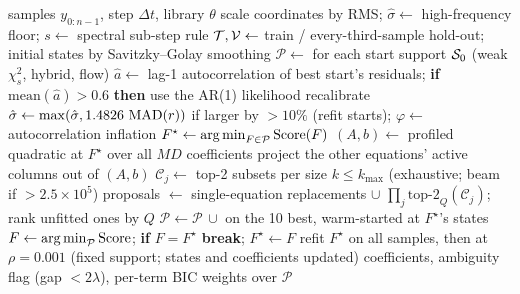 \begin{algorithm}[t]
\caption{PJSS (white-noise path). Defaults: $\rho=0.03$, $c=2$, $k_{\max}=5$, two candidates per size, ten finalists, two rounds.}
\label{alg:pjss}
\begin{algorithmic}[1]
\Require samples $y_{0:n-1}$, step $\Delta t$, library $\theta$
\State scale coordinates by RMS; $\hat\sigma\gets$ high-frequency floor; $s\gets$ spectral sub-step rule
\State $\mathcal{T},\mathcal{V}\gets$ train / every-third-sample hold-out; initial states by Savitzky--Golay smoothing
\State $\mathcal P\gets$  for each start support $\mathcal{S}_0$ (weak $\chi^2_s$, hybrid, flow)
\State $\hat a\gets$ lag-1 autocorrelation of best start's residuals; \textbf{if} $\mathrm{mean}(\hat a)>0.6$ \textbf{then} use the AR(1) likelihood
\State recalibrate $\hat\sigma\gets\max(\hat\sigma,1.4826\,\operatorname{MAD}(r))$ if larger by $>10\%$ (refit starts); $\varphi\gets$ autocorrelation inflation
\State $F^\star\gets\operatorname*{arg\,min}_{F\in\mathcal P}\mathrm{Score}(F)$
  \State $(A,b)\gets$ profiled quadratic at $F^\star$ over all $MD$ coefficients
    \State project the other equations' active columns out of $(A,b)$
    \State $\mathcal C_j\gets$ top-2 subsets per size $k\le k_{\max}$ (exhaustive; beam if $>2.5\times10^5$)
  \EndFor
  \State proposals $\gets$ single-equation replacements $\cup$ $\prod_j\text{top-2}_Q(\mathcal C_j)$; rank unfitted ones by $Q$
  \State $\mathcal P\gets\mathcal P\,\cup$  on the 10 best, warm-started at $F^\star$'s states
  \State $F\gets\operatorname*{arg\,min}_{\mathcal P}\mathrm{Score}$; \textbf{if} $F=F^\star$ \textbf{break}; $F^\star\gets F$
\EndFor
\State refit $F^\star$ on all samples, then at $\rho=0.001$ (fixed support; states and coefficients updated)
\State \Return coefficients, ambiguity flag (gap $<2\lambda$), per-term BIC weights over $\mathcal P$
\end{algorithmic}
\end{algorithm}

